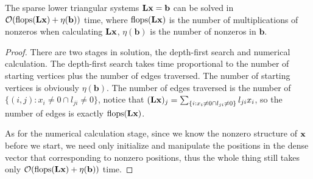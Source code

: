 \begin{thm}
    \label{thm::sparseLxbcost}
    The sparse lower triangular systems ${\mathbf{L}}{\mathbf{x}}=\mathbf{b}$ can 
    be solved in $\mathcal{O}(\mathrm{flops}({\mathbf{L}}{\mathbf{x}})+
    \eta(\mathbf{b}))$ time, where $\mathrm{flops}({\mathbf{L}}{\mathbf{x}})$ is 
    the number of multiplications of nonzeros when calculating 
    ${\mathbf{L}}{\mathbf{x}}$, $\eta(\mathbf{b})$ is the number of nonzeros in 
    $\mathbf{b}$.
\end{thm}
\begin{proof}
    There are two stages in solution, the depth-first search and 
    numerical calculation. The depth-first search takes time 
    proportional to the number of starting vertices plus the 
    number of edges traversed. The number of starting vertices 
    is obviously $\eta(\mathbf{b})$. The number of edges 
    traversed is the number of $\{(i,j):x_i\neq 0\cap 
    l_{ji}\neq 0\}$, notice that $({\mathbf{L}}{\mathbf{x}})_j=
    \sum_{\{i:x_i\neq 0\cap l_{ji}\neq 0\}}l_{ji}x_i$, so the 
    number of edges is exactly $\mathrm{flops}({\mathbf{L}}{\mathbf{x}})$. 

    As for the numerical calculation stage, since we know the 
    nonzero structure of ${\mathbf{x}}$ before we start, we need only 
    initialize and manipulate the positions in the dense 
    vector that corresponding to nonzero positions, thus the 
    whole thing still takes only $\mathcal{O}(\mathrm{flops}
    ({\mathbf{L}}{\mathbf{x}})+\eta(\mathbf{b}))$ time.
\end{proof}

